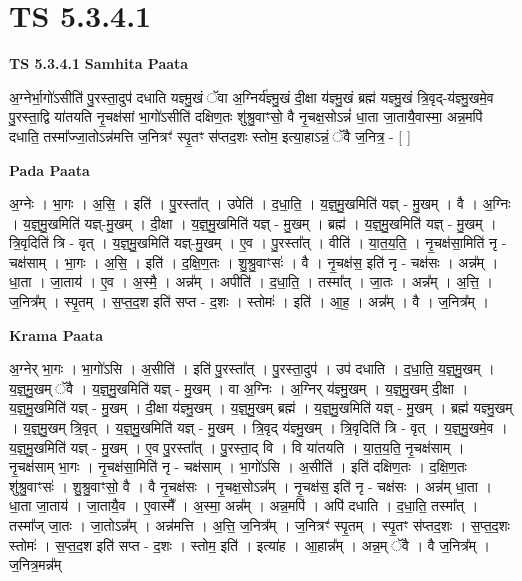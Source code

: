 \documentclass[17pt]{extarticle}
\begin{document}
\section{ TS 5.3.4.1 }

\textbf{TS 5.3.4.1 } \newline
\textbf{Samhita Paata} \newline

अ॒ग्नेर्भा॒गो॑ऽसीति॑ पु॒रस्ता॒दुप॑ दधाति यज्ञ्मु॒खं ॅवा अ॒ग्निर्य॑ज्ञ्मु॒खं दी॒क्षा य॑ज्ञ्मु॒खं ब्रह्म॑ यज्ञ्मु॒खं त्रि॒वृद्-य॑ज्ञ्मु॒खमे॒व पु॒रस्ता॒द्वि या॑तयति नृ॒चक्ष॑सां भा॒गो॑ऽसीति॑ दक्षिण॒तः शु॑श्रु॒वाꣳसो॒ वै नृ॒चक्ष॒सोऽन्नं॑ धा॒ता जा॒तायै॒वास्मा॒ अन्न॒मपि॑ दधाति॒ तस्मा᳚ज्जा॒तोऽन्न॑मत्ति ज॒नित्रꣳ॑ स्पृ॒तꣳ स॑प्तद॒शः स्तोम॒ इत्या॒हाऽन्नं॒ ॅवै ज॒नित्र॒ - [  ] \newline

\textbf{Pada Paata} \newline

अ॒ग्नेः । भा॒गः । अ॒सि॒ । इति॑ । पु॒रस्ता᳚त् । उपेति॑ । द॒धा॒ति॒ । य॒ज्ञ्॒मु॒खमिति॑ यज्ञ् - मु॒खम् । वै । अ॒ग्निः । य॒ज्ञ्॒मु॒खमिति॑ यज्ञ्-मु॒खम् । दी॒क्षा । य॒ज्ञ्॒मु॒खमिति॑ यज्ञ् - मु॒खम् । ब्रह्म॑ । य॒ज्ञ्॒मु॒खमिति॑ यज्ञ् - मु॒खम् । त्रि॒वृदिति॑ त्रि - वृत् । य॒ज्ञ्॒मु॒खमिति॑ यज्ञ्-मु॒खम् । ए॒व । पु॒रस्ता᳚त् । वीति॑ । या॒त॒य॒ति॒ । नृ॒चक्ष॑सा॒मिति॑ नृ - चक्ष॑साम् । भा॒गः । अ॒सि॒ । इति॑ । द॒क्षि॒ण॒तः । शु॒श्रु॒वाꣳसः॑ । वै । नृ॒चक्ष॑स॒ इति॑ नृ - चक्ष॑सः । अन्न᳚म् । धा॒ता । जा॒ताय॑ । ए॒व । अ॒स्मै॒ । अन्न᳚म् । अपीति॑ । द॒धा॒ति॒ । तस्मा᳚त् । जा॒तः । अन्न᳚म् । अ॒त्ति॒ । ज॒नित्र᳚म् । स्पृ॒तम् । स॒प्त॒द॒श इति॑ सप्त - द॒शः । स्तोमः॑ । इति॑ । आ॒ह॒ । अन्न᳚म् । वै । ज॒नित्र᳚म् ।  \newline


\textbf{Krama Paata} \newline

अ॒ग्नेर् भा॒गः । भा॒गो॑ऽसि । अ॒सीति॑ । इति॑ पु॒रस्ता᳚त् । पु॒रस्ता॒दुप॑ । उप॑ दधाति । द॒धा॒ति॒ य॒ज्ञ्॒मु॒खम् । य॒ज्ञ्॒मु॒खम् ॅवै । य॒ज्ञ्॒मु॒खमिति॑ यज्ञ् - मु॒खम् । वा अ॒ग्निः । अ॒ग्निर् य॑ज्ञ्मु॒खम् । य॒ज्ञ्॒मु॒खम् दी॒क्षा । य॒ज्ञ्॒मु॒खमिति॑ यज्ञ् - मु॒खम् । दी॒क्षा य॑ज्ञ्मु॒खम् । य॒ज्ञ्॒मु॒खम् ब्रह्म॑ । य॒ज्ञ्॒मु॒खमिति॑ यज्ञ् - मु॒खम् । ब्रह्म॑ यज्ञ्मु॒खम् । य॒ज्ञ्॒मु॒खम् त्रि॒वृत् । य॒ज्ञ्॒मु॒खमिति॑ यज्ञ् - मु॒खम् । त्रि॒वृद् य॑ज्ञ्मु॒खम् । त्रि॒वृदिति॑ त्रि - वृत् । य॒ज्ञ्॒मु॒खमे॒व । य॒ज्ञ्॒मु॒खमिति॑ यज्ञ् - मु॒खम् । ए॒व पु॒रस्ता᳚त् । पु॒रस्ता॒द् वि । वि या॑तयति । या॒त॒य॒ति॒ नृ॒चक्ष॑साम् । नृ॒चक्ष॑साम् भा॒गः । नृ॒चक्ष॑सा॒मिति॑ नृ - चक्ष॑साम् । भा॒गो॑ऽसि । अ॒सीति॑ । इति॑ दक्षिण॒तः । द॒क्षि॒ण॒तः शु॑श्रु॒वाꣳसः॑ । शु॒श्रु॒वाꣳसो॒ वै । वै नृ॒चक्ष॑सः । नृ॒चक्ष॒सोऽन्न᳚म् । नृ॒चक्ष॑स॒ इति॑ नृ - चक्ष॑सः । अन्न॑म् धा॒ता । धा॒ता जा॒ताय॑ । जा॒तायै॒व । ए॒वास्मै᳚ । अ॒स्मा॒ अन्न᳚म् । अन्न॒मपि॑ । अपि॑ दधाति । द॒धा॒ति॒ तस्मा᳚त् । तस्मा᳚ज् जा॒तः । जा॒तोऽन्न᳚म् । अन्न॑मत्ति । अ॒त्ति॒ ज॒नित्र᳚म् । ज॒नित्रꣳ॑ स्पृ॒तम् । स्पृ॒तꣳ स॑प्तद॒शः । स॒प्त॒द॒शः स्तोमः॑ । स॒प्त॒द॒श इति॑ सप्त - द॒शः । स्तोम॒ इति॑ । इत्या॑ह । आ॒हान्न᳚म् । अन्न॒म् ॅवै । वै ज॒नित्र᳚म् । ज॒नित्र॒मन्न᳚म् \newline
\end{document}
